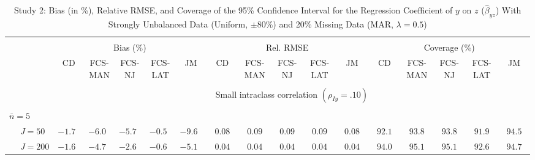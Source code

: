 \begin{sidewaystable}
\begin{threeparttable}
\setlength{\tabcolsep}{1.0pt}
\renewcommand{\arraystretch}{0.95}
\footnotesize
\caption{\small Study 2: Bias (in \%), Relative RMSE, and Coverage of the 95\% Confidence Interval for the Regression Coefficient of $y$ on $z$ ($\hat\beta_{yz}$) With Strongly Unbalanced Data (Uniform, $\pm 80\%$) and 20\% Missing Data (MAR, $\lambda=0.5$)}
\begin{tabular}{llccccccccccccccc}
\hline\\[-1.8ex]
& & \multicolumn{5}{c}{Bias (\%)} & \multicolumn{5}{c}{Rel. RMSE} & \multicolumn{5}{c}{Coverage (\%)} \\ \cmidrule(r){3-7}\cmidrule(r){8-12}\cmidrule(r){13-17}
 &  & CD & \makecell{FCS-\\MAN} & \makecell{FCS-\\NJ} & \makecell{FCS-\\LAT} & JM & CD & \makecell{FCS-\\MAN} & \makecell{FCS-\\NJ} & \makecell{FCS-\\LAT} & JM & CD & \makecell{FCS-\\MAN} & \makecell{FCS-\\NJ} & \makecell{FCS-\\LAT} & \multicolumn{1}{c}{JM} \\ 
[0.4ex]\hline\\[-1.8ex]
& & \multicolumn{15}{c}{Small intraclass correlation $(\rho_{Iy}=.10)$} \\[0.6ex]\hline\\[-1.8ex]
\multicolumn{4}{l}{$\bar{n}=5$} \\  & \nopagebreak $\;J=50$  & ${-}1.7\phantom{0}$ & ${-}6.0\phantom{0}$ & ${-}5.7\phantom{0}$ & ${-}0.5\phantom{0}$ & ${-}9.6\phantom{0}$ & $\phantom{0}0.08\phantom{0}$ & $\phantom{0}0.09\phantom{0}$ & $\phantom{0}0.09\phantom{0}$ & $\phantom{0}0.09\phantom{0}$ & $\phantom{0}0.08\phantom{0}$ & $\phantom{0}92.1\phantom{0}$ & $\phantom{0}93.8\phantom{0}$ & $\phantom{0}93.8\phantom{0}$ & $\phantom{0}91.9\phantom{0}$ & $\phantom{0}94.5\phantom{0}$ \\
 & \nopagebreak $\;J=200$  & ${-}1.6\phantom{0}$ & ${-}4.7\phantom{0}$ & ${-}2.6\phantom{0}$ & ${-}0.6\phantom{0}$ & ${-}5.1\phantom{0}$ & $\phantom{0}0.04\phantom{0}$ & $\phantom{0}0.04\phantom{0}$ & $\phantom{0}0.04\phantom{0}$ & $\phantom{0}0.04\phantom{0}$ & $\phantom{0}0.04\phantom{0}$ & $\phantom{0}94.0\phantom{0}$ & $\phantom{0}95.1\phantom{0}$ & $\phantom{0}95.1\phantom{0}$ & $\phantom{0}92.6\phantom{0}$ & $\phantom{0}94.7\phantom{0}$ \\

\end{tabular}
\end{threeparttable}
\end{sidewaystable}
